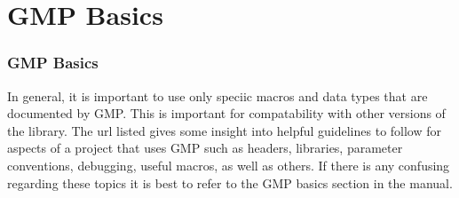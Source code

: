 
\section{GMP Basics}

\begin{frame}
\frametitle{GMP Basics}
In general, it is important to use only speciic macros and data types that are documented by GMP. This is important for
compatability with other versions of the library. The url listed gives some insight into helpful guidelines to follow
for aspects of a project that uses GMP such as headers, libraries, parameter conventions, debugging, useful macros, as well as others.
If there is any confusing regarding these topics it is best to refer to the GMP basics section in the manual.
\end{frame}
